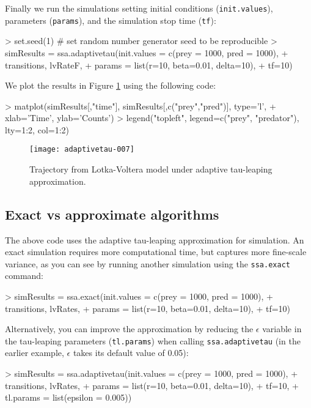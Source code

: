 \documentclass[11pt,nogin]{article}
\begin{document}
Finally we run the simulations setting initial conditions (\texttt{init.values}), parameters (\texttt{params}), and the simulation stop time (\texttt{tf}):
\begin{Schunk}
\begin{Sinput}
> set.seed(1) # set random number generator seed to be reproducible
> simResults = ssa.adaptivetau(init.values = c(prey = 1000, pred = 1000),
+                              transitions, lvRateF,
+                              params = list(r=10, beta=0.01, delta=10),
+                              tf=10)
\end{Sinput}
\end{Schunk}
We plot the results in Figure \ref{fig-lv} using the following code:
\begin{Schunk}
\begin{Sinput}
> matplot(simResults[,"time"], simResults[,c("prey","pred")], type='l',
+         xlab='Time', ylab='Counts')
> legend("topleft", legend=c("prey", "predator"), lty=1:2, col=1:2)
\end{Sinput}
\end{Schunk}

\begin{figure}
  \centerline{
\texttt{[image: adaptivetau-007]}
}\caption{\label{fig-lv} Trajectory from Lotka-Voltera model under adaptive tau-leaping approximation.}
\end{figure}

\subsection*{Exact vs approximate algorithms}
The above code uses the adaptive tau-leaping approximation for simulation.  An exact simulation requires more computational time, but captures more fine-scale variance, as you can see by running another simulation using the \texttt{ssa.exact} command:
\begin{Schunk}
\begin{Sinput}
> simResults = ssa.exact(init.values = c(prey = 1000, pred = 1000),
+                              transitions, lvRates,
+                              params = list(r=10, beta=0.01, delta=10),
+                              tf=10)
\end{Sinput}
\end{Schunk}
Alternatively, you can improve the approximation by reducing the $\epsilon$ variable in the tau-leaping parameters (\texttt{tl.params}) when calling \texttt{ssa.adaptivetau} (in the earlier example, $\epsilon$ takes its default value of 0.05):
\begin{Schunk}
\begin{Sinput}
> simResults = ssa.adaptivetau(init.values = c(prey = 1000, pred = 1000),
+                              transitions, lvRates,
+                              params = list(r=10, beta=0.01, delta=10),
+                              tf=10,
+                              tl.params = list(epsilon = 0.005))
\end{Sinput}
\end{Schunk}
\end{document}
